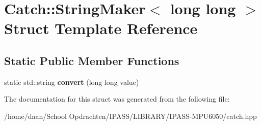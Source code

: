 \hypertarget{structCatch_1_1StringMaker_3_01long_01long_01_4}{}\section{Catch\+:\+:String\+Maker$<$ long long $>$ Struct Template Reference}
\label{structCatch_1_1StringMaker_3_01long_01long_01_4}
\subsection*{Static Public Member Functions}
\begin{DoxyCompactItemize}
\item 
\mbox{\label{structCatch_1_1StringMaker_3_01long_01long_01_4_a7a58929dca2a14c576d7d6d08bc615d2}} 
static std\+::string {\bfseries convert} (long long value)
\end{DoxyCompactItemize}


The documentation for this struct was generated from the following file\+:\begin{DoxyCompactItemize}
\item 
/home/daan/\+School Opdrachten/\+I\+P\+A\+S\+S/\+L\+I\+B\+R\+A\+R\+Y/\+I\+P\+A\+S\+S-\/\+M\+P\+U6050/catch.\+hpp\end{DoxyCompactItemize}
